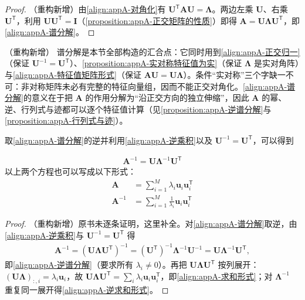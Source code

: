 \documentclass[../main.tex]{subfiles}
\begin{document}
\begin{proof}
（重构新增）由\eqref{align:appA-对角化}有 $\bm{U}^{\mathsf{T}}\bm{A}\bm{U}=\bm{\Lambda}$。两边左乘 $\bm{U}$、右乘 $\bm{U}^{\mathsf{T}}$，利用 $\bm{U}\bm{U}^{\mathsf{T}}=\bm{I}$（\cref{proposition:appA-正交矩阵的性质}）即得 $\bm{A}=\bm{U}\bm{\Lambda}\bm{U}^{\mathsf{T}}$，即\eqref{align:appA-谱分解}。
\end{proof}

\begin{remark}（重构新增）
谱分解是本节全部构造的汇合点：它同时用到\eqref{align:appA-正交归一}（保证 $\bm{U}^{-1}=\bm{U}^{\mathsf{T}}$）、\cref{proposition:appA-实对称特征值为实}（保证 $\bm{\Lambda}$ 是实对角阵）与\eqref{align:appA-特征值矩阵形式}（保证 $\bm{A}\bm{U}=\bm{U}\bm{\Lambda}$）。条件“实对称”三个字缺一不可：非对称矩阵未必有完整的特征向量组，因而不能正交对角化。\eqref{align:appA-谱分解}的意义在于把 $\bm{A}$ 的作用分解为“沿正交方向的独立伸缩”，因此 $\bm{A}$ 的幂、逆、行列式与迹都可以逐个特征值计算（见\cref{proposition:appA-逆谱分解}与\cref{proposition:appA-行列式与迹}）。
\end{remark}

取\eqref{align:appA-谱分解}的逆并利用\eqref{align:appA-逆乘积}以及 $\bm{U}^{-1}=\bm{U}^{\mathsf{T}}$，可以得到
\begin{proposition}[逆矩阵的谱分解与求和形式]\label{proposition:appA-逆谱分解}
\begin{align}
  \bm{A}^{-1}=\bm{U}\bm{\Lambda}^{-1}\bm{U}^{\mathsf{T}}
  \label{align:appA-逆谱分解}
\end{align}
以上两个方程也可以写成以下形式：
\begin{align}
  \bm{A}&=\sum_{i=1}^{M}\lambda_i\bm{u}_i\bm{u}_i^{\mathsf{T}}
  \label{align:appA-求和形式}\\
  \bm{A}^{-1}&=\sum_{i=1}^{M}\frac{1}{\lambda_i}\bm{u}_i\bm{u}_i^{\mathsf{T}}
  \label{align:appA-逆求和形式}
\end{align}
\end{proposition}

\begin{proof}
（重构新增）原书未逐条证明，这里补全。对\eqref{align:appA-谱分解}取逆，由\eqref{align:appA-逆乘积}与 $\bm{U}^{-1}=\bm{U}^{\mathsf{T}}$ 得
\begin{align*}
  \bm{A}^{-1}=(\bm{U}\bm{\Lambda}\bm{U}^{\mathsf{T}})^{-1}=(\bm{U}^{\mathsf{T}})^{-1}\bm{\Lambda}^{-1}\bm{U}^{-1}=\bm{U}\bm{\Lambda}^{-1}\bm{U}^{\mathsf{T}},
\end{align*}
即\eqref{align:appA-逆谱分解}（要求所有 $\lambda_i\neq0$）。再把 $\bm{U}\bm{\Lambda}\bm{U}^{\mathsf{T}}$ 按列展开：$(\bm{U}\bm{\Lambda})_{:,i}=\lambda_i\bm{u}_i$，故 $\bm{U}\bm{\Lambda}\bm{U}^{\mathsf{T}}=\sum_i\lambda_i\bm{u}_i\bm{u}_i^{\mathsf{T}}$，即\eqref{align:appA-求和形式}；对 $\bm{\Lambda}^{-1}$ 重复同一展开得\eqref{align:appA-逆求和形式}。
\end{proof}
\end{document}
